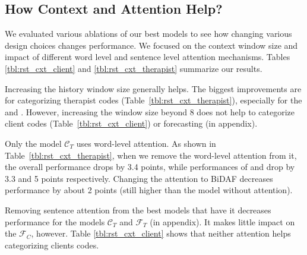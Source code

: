\subsection{How Context and Attention Help?}
\label{ssec:abl_context_attention}

We evaluated various ablations of our best models to see how
changing various design choices changes performance. We focused on
the context window size and impact of different word level and
sentence level attention mechanisms. Tables \ref{tbl:rst_cxt_client}
and \ref{tbl:rst_cxt_therapist} summarize our results.

Increasing the history window size generally helps. The biggest
improvements are for categorizing therapist codes
(Table~\ref{tbl:rst_cxt_therapist}), especially for the \RES and
\REC. However, increasing the window size beyond 8 does not help
to categorize client codes (Table~\ref{tbl:rst_cxt_client}) or
forecasting (in appendix).

Only the model $\mathcal{C}_{T}$ uses word-level attention. As shown
in Table~\ref{tbl:rst_cxt_therapist}, when we remove the word-level
attention from it, the overall performance drops by 3.4 points,
while performances of \RES and \REC drop by 3.3 and 5 points
respectively. Changing the attention to BiDAF decreases performance
by about 2 points (still higher than the model without attention).

 Removing sentence attention
from the best models that have it decreases performance for the
models $\mathcal{C}_T$ and $\mathcal{F}_T$ (in appendix).
%
%
  It makes little impact
on the $\mathcal{F}_C$, however.
%
Table \ref{tbl:rst_cxt_client} shows that neither attention helps
categorizing clients codes.
%


